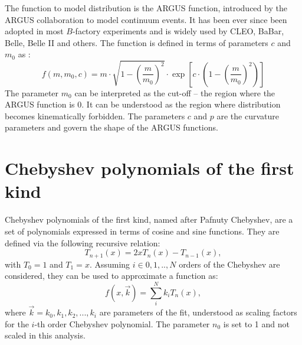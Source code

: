 The function to model \epem\ra\qqbar distribution is the ARGUS function, introduced by the ARGUS collaboration to model continuum events.
It has been ever since been adopted in most $B$-factory experiments and is widely used by CLEO, BaBar, Belle, Belle II and others.
The function is defined in terms of parameters $c$ and $m_0$ as \cite{ARGUS:1990hfq}:
\begin{equation}\label{eq:argus_function}
    f(m, m_0, c) = m \cdot \sqrt{ 1 - \left( \frac{m}{m_0} \right)^2}
    \cdot \exp\left[ c \cdot \left(1 - \left(\frac{m}{m_0}\right)^2 \right) \right]
\end{equation}
The parameter $m_0$ can be interpreted as the cut-off -- the region where the ARGUS function is 0.
It can be understood as the region where \Mbc distribution becomes kinematically forbidden.
The parameters $c$ and $p$ are the curvature parameters and govern the shape of the ARGUS functions.

\section{Chebyshev polynomials of the first kind}\label{sec:chebyshev_distribution}
Chebyshev polynomials of the first kind, named after Pafnuty Chebyshev, are a set of polynomials expressed in terms of cosine and sine functions.
They are defined via the following recursive relation:
\begin{equation}\label{eq:chebyshev_generator}
    T_{n+1}(x) = 2xT_n(x) - T_{n-1}(x),
\end{equation}
with $T_0=1$ and $T_1=x$.
Assuming $i\in{0,1,.., N}$ orders of the Chebyshev are considered, they can be used to approximate a function as:
\begin{equation}\label{eq:chebyshev_pdf}
    f(x, \vec{k}) = \sum_i^N k_i T_n(x),
\end{equation}
where $\vec{k}={k_0,k_1,k_2,...,k_i}$ are parameters of the fit, understood as scaling factors for the $i$-th order Chebyshev polynomial.
The parameter $n_0$ is set to 1 and not scaled in this analysis. 